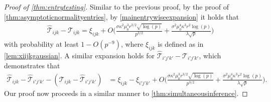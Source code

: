 \documentclass[10pt]{article}
\newcommand{\0}{{\mathbf{0}}}
\newcommand{\1}{{\mathbf{1}}}
\renewcommand{\hat}{\widehat}
\renewcommand{\hat}{\widehat}
\begin{document}
\begin{proof}[Proof of \cref{thm:entrytesting}]
Similar to the previous proof, by the proof of \cref{thm:asymptoticnormalityentries}, by \eqref{mainentrywiseexpansion} it holds that
\begin{align*}
    \mathcal{\hat T}_{ijk} - \mathcal{T}_{ijk} = \xi_{ijk} + O\bigg( \frac{\sigma \kappa^2 \mu_0^3 r^{3/2} \sqrt{\log(p)}}{p^{3/2}} + \frac{\sigma^2 \mu_0^4 \kappa^3 r^2 \log(p)}{\lambda \sqrt{p}} \bigg)
\end{align*}
with probability at least $1 - O(p^{-9})$, where $\xi_{ijk}$ is defined as in \cref{lem:xiijkgaussian}.  A similar expansion holds for $\mathcal{\hat T}_{i'j'k'} - \mathcal{T}_{i'j'k'}$, which demonstrates that
\begin{align*}
    \mathcal{\hat T}_{ijk} - \mathcal{\hat T}_{i'j'k'} - (\mathcal{T}_{ijk} - \mathcal{\hat T}_{i'j'k'}) &= \xi_{ijk} - \mathcal{\xi}_{i'j'k'} + O\bigg( \frac{\sigma \kappa^2 \mu_0^3 r^{3/2} \sqrt{\log(p)}}{p^{3/2}} + \frac{\sigma^2 \mu_0^4 \kappa^3 r^2 \log(p)}{\lambda \sqrt{p}} \bigg).
\end{align*}
Our proof now proceeds in a similar manner to \cref{thm:simultaneousinference}.


\end{proof}
\end{document}
